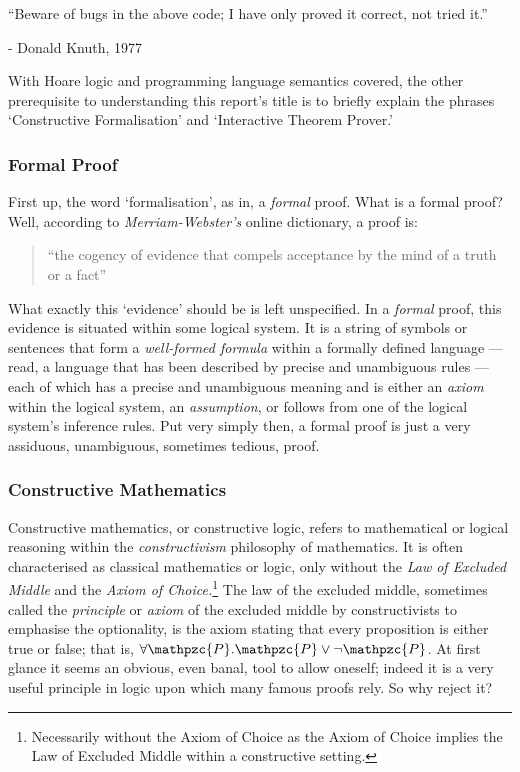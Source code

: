 \documentclass[oneside,12pt]{article}
\newcommand{\textM}[1]{\ensuremath{\mathpzc{#1}}}
\begin{document}
\epigraph{ ``Beware of bugs in the above code; I have only proved it correct, not tried it.''}{ \scriptsize - Donald Knuth, 1977}


With Hoare logic and programming language semantics covered, the other prerequisite to understanding this report's title is to briefly explain the phrases `Constructive Formalisation' and `Interactive Theorem Prover.'

\subsubsection{Formal Proof}

First up, the word `formalisation', as in, a \emph{formal} proof. What is a formal proof? Well, according to \emph{Merriam-Webster's} online dictionary, a proof is:

\begin{quote}
  ``the cogency of evidence that compels acceptance by the mind of a truth or a fact''
\end{quote}


What exactly this `evidence' should be is left unspecified. In a \emph{formal} proof, this evidence is situated within some logical system. It is a string of symbols or sentences that form a \emph{well-formed formula} within a formally defined language --- read, a language that has been described by precise and unambiguous rules --- each of which has a precise and unambiguous meaning and is either an \emph{axiom} within the logical system, an \emph{assumption}, or follows from one of the logical system's inference rules. Put very simply then, a formal proof is just a very assiduous, unambiguous, sometimes tedious, proof. 


\subsubsection{Constructive Mathematics}


Constructive mathematics, or constructive logic, refers to mathematical or logical reasoning within the \emph{constructivism} philosophy of mathematics. It is often characterised as classical mathematics or logic, only without the \emph{Law of Excluded Middle} and the \emph{Axiom of Choice.}\footnote{Necessarily without the Axiom of Choice as the Axiom of Choice implies the Law of Excluded Middle within a constructive setting.} The law of the excluded middle, sometimes called the \emph{principle} or \emph{axiom} of the excluded middle by constructivists to emphasise the optionality, is the axiom stating that every proposition is either true or false; that is, $\forall \textM{P} . \textM{P} \vee \neg \textM{P}$. At first glance it seems an obvious, even banal, tool to allow oneself; indeed it is a very useful principle in logic upon which many famous proofs rely. So why reject it?
\end{document}

